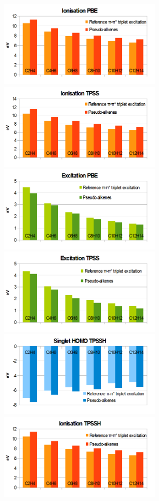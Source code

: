 \documentclass[journal=jctcce,manuscript=article]{achemso}
\begin{document}
\begin{figure}[h]
\includegraphics[width=8cm]{pbe_ionisation}
\includegraphics[width=8cm]{tpss_ionisation}
\includegraphics[width=8cm]{pbe_excitation}
\includegraphics[width=8cm]{tpss_excitation}
\includegraphics[width=8cm]{tpssh_homo}
\includegraphics[width=8cm]{tpssh_ionisation}

\end{figure}
\end{document}
